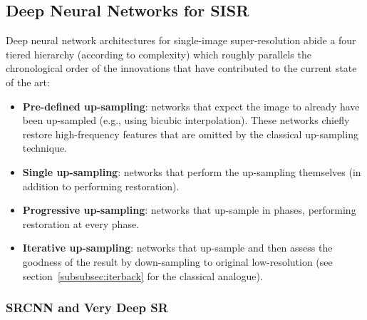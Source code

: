 \subsection{Deep Neural Networks for SISR}
Deep neural network architectures for single-image super-resolution abide a four tiered hierarchy (according to complexity) which roughly parallels the chronological order of the innovations that have contributed to the current state of the art:
\begin{mdframed}
    \begin{itemize}
        \item \textbf{Pre-defined up-sampling}: networks that expect the image to already have been up-sampled (e.g., using bicubic interpolation). These networks chiefly restore high-frequency features that are omitted by the classical up-sampling technique.
        \item \textbf{Single up-sampling}: networks that perform the up-sampling themselves (in addition to performing restoration).
        \item \textbf{Progressive up-sampling}: networks that up-sample in phases, performing restoration at every phase.
        \item \textbf{Iterative up-sampling}: networks that up-sample and then assess the goodness of the result by down-sampling to original low-resolution (see section~\ref{subsubsec:iterback} for the classical analogue).
    \end{itemize}
\end{mdframed}



\subsubsection{SRCNN and Very Deep SR}\label{subsubsec:vdsr}




